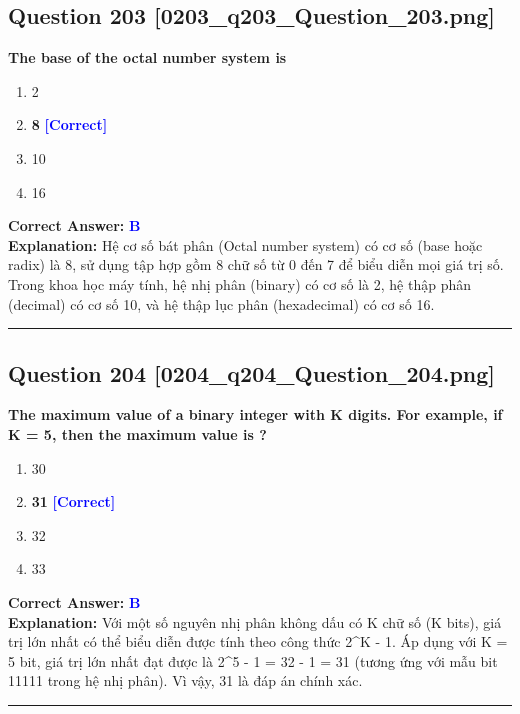 \documentclass[11pt,a4paper]{article}
\begin{document}
\begin{minipage}{\textwidth}
\subsection*{Question 203 \quad \footnotesize{[0203\_q203\_Question\_203.png]}}
\noindent \textbf{The base of the octal number system is}

\begin{enumerate}[label=\Alph*.]
    \item 2
    \item \textbf{8} \hfill \textcolor{blue}{\textbf{[Correct]}}
    \item 10
    \item 16
\end{enumerate}

\noindent \textbf{Correct Answer:} \textcolor{blue}{\textbf{B}} \\[2pt]
\noindent \textbf{Explanation:} Hệ cơ số bát phân (Octal number system) có cơ số (base hoặc radix) là 8, sử dụng tập hợp gồm 8 chữ số từ 0 đến 7 để biểu diễn mọi giá trị số. Trong khoa học máy tính, hệ nhị phân (binary) có cơ số là 2, hệ thập phân (decimal) có cơ số 10, và hệ thập lục phân (hexadecimal) có cơ số 16.

\par\vspace{0.3cm}
\hrule
\vspace{0.3cm}
\end{minipage}

\begin{minipage}{\textwidth}
\subsection*{Question 204 \quad \footnotesize{[0204\_q204\_Question\_204.png]}}
\noindent \textbf{The maximum value of a binary integer with K digits. For example, if K = 5, then the maximum value is ?}

\begin{enumerate}[label=\Alph*.]
    \item 30
    \item \textbf{31} \hfill \textcolor{blue}{\textbf{[Correct]}}
    \item 32
    \item 33
\end{enumerate}

\noindent \textbf{Correct Answer:} \textcolor{blue}{\textbf{B}} \\[2pt]
\noindent \textbf{Explanation:} Với một số nguyên nhị phân không dấu có K chữ số (K bits), giá trị lớn nhất có thể biểu diễn được tính theo công thức 2\textasciicircum{}K - 1. Áp dụng với K = 5 bit, giá trị lớn nhất đạt được là 2\textasciicircum{}5 - 1 = 32 - 1 = 31 (tương ứng với mẫu bit 11111 trong hệ nhị phân). Vì vậy, 31 là đáp án chính xác.

\par\vspace{0.3cm}
\hrule
\vspace{0.3cm}
\end{minipage}
\end{document}
